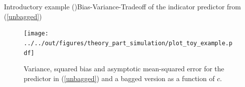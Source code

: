 \documentclass{beamer}
\begin{document}







\begin{frame}{Introductory example (\cite{Buhlmann2002})}{Bias-Variance-Tradeoff of the indicator predictor from (\ref{unbagged})}
\begin{center}
\begin{figure}
\texttt{[image: ../../out/figures/theory\_part\_simulation/plot\_toy\_example.pdf]}
\caption{Variance, squared bias and asymptotic mean-squared error for the predictor in (\ref{unbagged}) and a bagged version as a function of $c$.}
\end{figure}
\end{center}
\end{frame}
\end{document}
